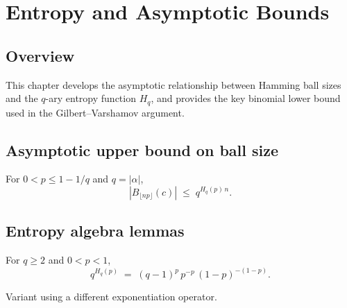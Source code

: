 \chapter{Entropy and Asymptotic Bounds}
\section{Overview}

This chapter develops the asymptotic relationship between Hamming ball sizes and the
$q$-ary entropy function $H_q$, and provides the key binomial lower bound used in the
Gilbert--Varshamov argument.

\section{Asymptotic upper bound on ball size}

\begin{theorem}
\leanok
{}
For $0<p\le 1-1/q$ and $q=|\alpha|$,
\[
|B_{\lfloor np\rfloor}(c)| \;\le\; q^{H_q(p)\,n}.
\]
\end{theorem}

\section{Entropy algebra lemmas}

\begin{lemma}[Simplifying $q^{H_q(p)}$]
\leanok
{}
For $q\ge 2$ and $0<p<1$,
\[
q^{H_q(p)} \;=\; (q-1)^p\,p^{-p}\,(1-p)^{-(1-p)}.
\]
\end{lemma}

\begin{lemma}
\leanok
{}
Variant using a different exponentiation operator.
\end{lemma}

